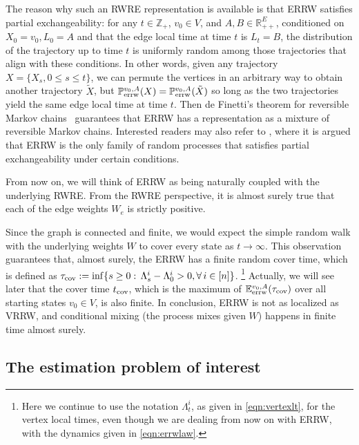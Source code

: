 \documentclass[a4paper, 11pt]{article}
\renewcommand{\P}{\mathbb{P}}
\newcommand{\E}{\mathbb{E}}
\newcommand{\Eerrw}{\E_{\textnormal{errw}}}
\newcommand{\Perrw}{\P_{\textnormal{errw}}}
\newcommand{\cov}{\textnormal{cov}}
\newif\ifva
\begin{document}
The reason why such an RWRE representation is available is that ERRW satisfies partial exchangeability: for any $t\in\mathbb{Z}_+$, $v_0\in V$, and $A, B\in\mathbb{R}_{++}^E$, conditioned on $X_0=v_0, L_0=A$ and that the edge local time at time $t$ is $L_t=B$, the distribution of the trajectory up to time $t$ is uniformly random among those trajectories that align with these conditions. 
In other words, given any trajectory $X=\{X_s, 0\leq s\leq t\}$, we can permute the vertices in an arbitrary way to obtain another trajectory $\tilde{X}$, but $\Perrw^{v_0,A}(X)=\Perrw^{v_0,A}(\tilde{X})$ so long as the two trajectories yield the same edge local time at time $t$. 
Then de Finetti's theorem for reversible Markov chains~\cite{dr} guarantees that ERRW has a representation as a mixture of reversible Markov chains. Interested readers may also refer to \cite{rolles}, where it is argued that ERRW is the only family of random processes that satisfies partial exchangeability under certain conditions.

From now on, we will think of ERRW as being naturally coupled with the underlying RWRE. From the RWRE perspective, %
it is almost surely true that each of the edge weights $W_e$ is strictly positive.
\ifva
\color{red}
\color{black}
\fi
Since the graph is connected and finite, we would expect the simple random walk with the underlying weights $W$ to cover every state as $t\rightarrow\infty$. This observation guarantees that, almost surely, the ERRW has a finite random cover time, which is defined as $\tau_\cov:=\inf\{s\geq 0:\,\Lambda_s^i-\Lambda_0^i>0,\forall\,i\in[n]\}$. 
\footnote{Here we continue to use the notation
$\Lambda_t^i$, as given in \cref{eqn:vertexlt},
for the vertex local times, even though we are dealing from now on with ERRW, with the dynamics given in \cref{eqn:errwlaw}.}
Actually, we will see later that the cover time $t_\cov$, which is the maximum of $\Eerrw^{v_0, A}(\tau_\cov)$ over all starting states $v_0\in V$, is also finite. In conclusion, ERRW is not as localized as VRRW, and conditional mixing (the process mixes given $W$) happens in finite time almost surely. 


\subsection{The estimation problem of interest}
\label{sec:formulation}
\end{document}
